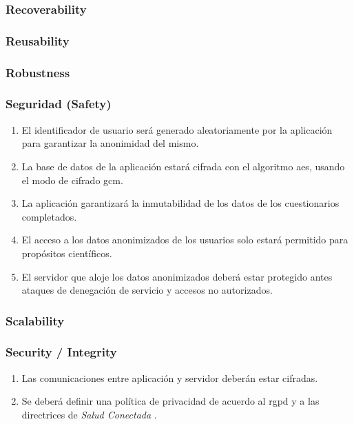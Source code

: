         \subsubsection{Recoverability}
        \subsubsection{Reusability}
        \subsubsection{Robustness}
        \subsubsection{Seguridad (Safety)}
            \begin{enumerate}[resume, label=\textbf{\texttt{RNF-\arabic*}}]
                \item El identificador de usuario será generado aleatoriamente por la aplicación para garantizar la anonimidad del mismo.  
                \item La base de datos de la aplicación estará cifrada con el algoritmo \gls{aes}, usando el modo de cifrado \gls{gcm}.
                \item La aplicación garantizará la inmutabilidad de los datos de los cuestionarios completados.
                \item El acceso a los datos anonimizados de los usuarios solo estará permitido para propósitos científicos.
                \item El servidor que aloje los datos anonimizados deberá estar protegido antes ataques de denegación de servicio y accesos no autorizados.
            \end{enumerate}
        \subsubsection{Scalability}
        \subsubsection{Security / Integrity}
            \begin{enumerate}[resume, label=\textbf{\texttt{RNF-\arabic*}}]
                \item Las comunicaciones entre aplicación y servidor deberán estar cifradas.
                \item Se deberá definir una política de privacidad de acuerdo al \gls{rgpd} \cite{publications_office_of_the_european_union_reglamento_nodate} y a las directrices de \textit{Salud Conectada} \cite{google_preguntas_nodate}.
            \end{enumerate}
